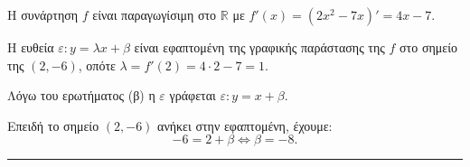 \begin{alist}
    \item Η συνάρτηση $f$ είναι παραγωγίσιμη στο $\mathbb{R}$ με $f'(x) = (2x^2 - 7x)' = 4x - 7$.
    \item Η ευθεία $\varepsilon : y = \lambda x + \beta$ είναι εφαπτομένη της γραφικής παράστασης της $f$ στο σημείο της $(2,-6)$, οπότε $\lambda = f'(2) = 4 \cdot 2 - 7 = 1$.
    \item Λόγω του ερωτήματος (β) η $\varepsilon$ γράφεται $\varepsilon : y = x + \beta$.
    
    Επειδή το σημείο $(2, -6)$ ανήκει στην εφαπτομένη, έχουμε:
    \[-6 = 2 + \beta \Leftrightarrow \beta = -8.\]
\end{alist}
\vspace{6mm}
\noindent\rule{\textwidth}{0.4pt}
\vspace{6mm}

